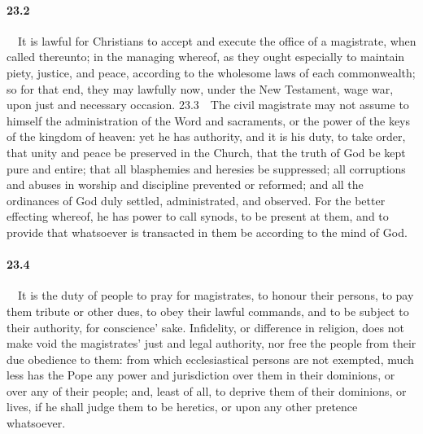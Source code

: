 \paragraph{23.2}\ \ It is lawful for Christians to accept and execute the office of a magistrate, when called thereunto; in the managing whereof, as they ought especially to maintain piety, justice, and peace, according to the wholesome laws of each commonwealth; so for that end, they may lawfully now, under the New Testament, wage war, upon just and necessary occasion.  23.3\ \ The civil magistrate may not assume to himself the administration of the Word and sacraments, or the power of the keys of the kingdom of heaven: yet he has authority, and it is his duty, to take order, that unity and peace be preserved in the Church, that the truth of God be kept pure and entire; that all blasphemies and heresies be suppressed; all corruptions and abuses in worship and discipline prevented or reformed; and all the ordinances of God duly settled, administrated, and observed. For the better effecting whereof, he has power to call synods, to be present at them, and to provide that whatsoever is transacted in them be according to the mind of God.   
\bigskip
\paragraph{23.4}\ \ It is the duty of people to pray for magistrates, to honour their persons, to pay them tribute or other dues, to obey their lawful commands, and to be subject to their authority, for conscience{}' sake. Infidelity, or difference in religion, does not make void the magistrates' just and legal authority, nor free the people from their due obedience to them: from which ecclesiastical persons are not exempted, much less has the Pope any power and jurisdiction over them in their dominions, or over any of their people; and, least of all, to deprive them of their dominions, or lives, if he shall judge them to be heretics, or upon any other pretence whatsoever.  

